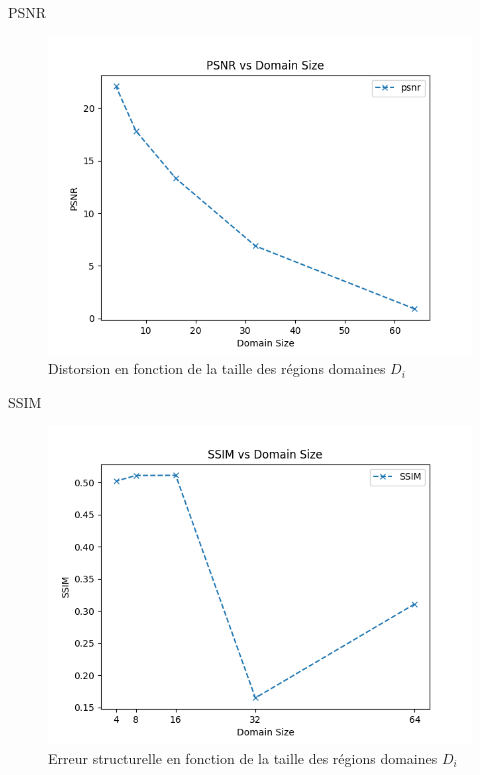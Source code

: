 \documentclass{beamer}
\begin{document}
\begin{frame}{PSNR}
	\begin{center}
	\begin{figure}
	\includegraphics[scale=0.5]{images/error_rate_2.png}
	\caption{Distorsion en fonction de la taille des régions domaines $D_i$}
	\end{figure}
	\end{center}
\end{frame}

\begin{frame}{SSIM}
	\begin{center}
	\begin{figure}
	\includegraphics[scale=0.5]{images/error_SSIM.png}
	\caption{Erreur structurelle en fonction de la taille des régions domaines $D_i$}
	\end{figure}
	\end{center}
\end{frame}
\end{document}
